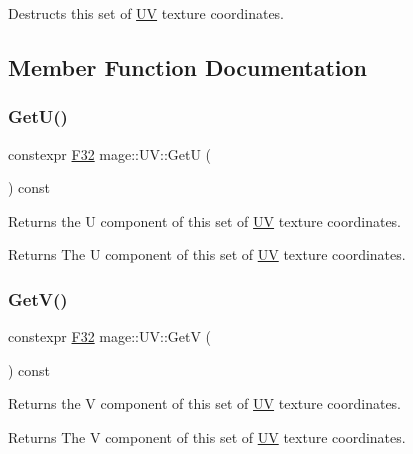 Destructs this set of \mbox{\hyperlink{structmage_1_1_u_v}{UV}} texture coordinates. 

\subsection{Member Function Documentation}
\mbox{\label{structmage_1_1_u_v_a8587903b07cab58428d01ed9ded97dd4}} 
\subsubsection{\texorpdfstring{Get\+U()}{GetU()}}
{\footnotesize\ttfamily constexpr \mbox{\hyperlink{namespacemage_aa97e833b45f06d60a0a9c4fc22ae02c0}{F32}} mage\+::\+U\+V\+::\+GetU (\begin{DoxyParamCaption}{ }\end{DoxyParamCaption}) const\hspace{0.3cm}{\ttfamily [noexcept]}}

Returns the U component of this set of \mbox{\hyperlink{structmage_1_1_u_v}{UV}} texture coordinates.

\begin{DoxyReturn}{Returns}
The U component of this set of \mbox{\hyperlink{structmage_1_1_u_v}{UV}} texture coordinates. 
\end{DoxyReturn}
\mbox{\label{structmage_1_1_u_v_a95b38718cb3eeaacebdfa306b4921d90}} 
\subsubsection{\texorpdfstring{Get\+V()}{GetV()}}
{\footnotesize\ttfamily constexpr \mbox{\hyperlink{namespacemage_aa97e833b45f06d60a0a9c4fc22ae02c0}{F32}} mage\+::\+U\+V\+::\+GetV (\begin{DoxyParamCaption}{ }\end{DoxyParamCaption}) const\hspace{0.3cm}{\ttfamily [noexcept]}}

Returns the V component of this set of \mbox{\hyperlink{structmage_1_1_u_v}{UV}} texture coordinates.

\begin{DoxyReturn}{Returns}
The V component of this set of \mbox{\hyperlink{structmage_1_1_u_v}{UV}} texture coordinates. 
\end{DoxyReturn}
\mbox{\label{structmage_1_1_u_v_a53bf93c8a9b97f07d2b7db5a7e22be51}} 
